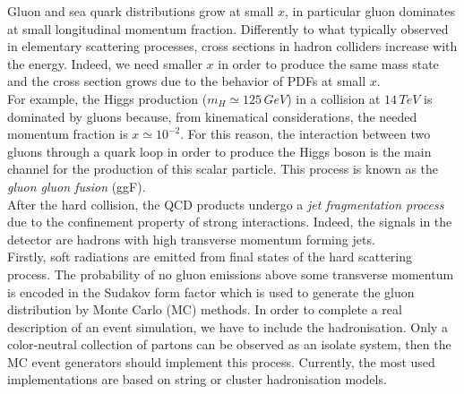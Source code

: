 Gluon and sea quark distributions grow at small $x$, in particular gluon dominates at small longitudinal momentum fraction. Differently to what typically observed in elementary scattering processes, cross sections in hadron colliders increase with the energy. Indeed, we need smaller $x$ in order to produce the same mass state and the cross section grows due to the behavior of PDFs at small $x$.\\
For example, the Higgs production ($m_H\simeq 125\,GeV$) in a collision at $14\,TeV$ is dominated by gluons because, from kinematical considerations, the needed momentum fraction is $x\simeq 10^{-2}$. For this reason, the interaction between two gluons through a quark loop in order to produce the Higgs boson is the main channel for the production of this scalar particle. This process is known as the \textit{gluon gluon fusion} (ggF).\\

After the hard collision, the QCD products undergo a \textit{jet fragmentation process} due to the confinement property of strong interactions. Indeed, the signals in the detector are hadrons with high transverse momentum forming jets.\\
Firstly, soft radiations are emitted from final states of the hard scattering process. The probability of no gluon emissions above some transverse momentum is encoded in the Sudakov form factor which is used to generate the gluon distribution by Monte Carlo (MC) methods. In order to complete a real description of an event simulation, we have to include the hadronisation. Only a color-neutral collection of partons can be observed as an isolate system, then the MC event generators should implement this process. Currently, the most used implementations are based on string \cite{Andersson:1983ia} or cluster \cite{Chahal:2022rid} hadronisation models.\\
\newpage

